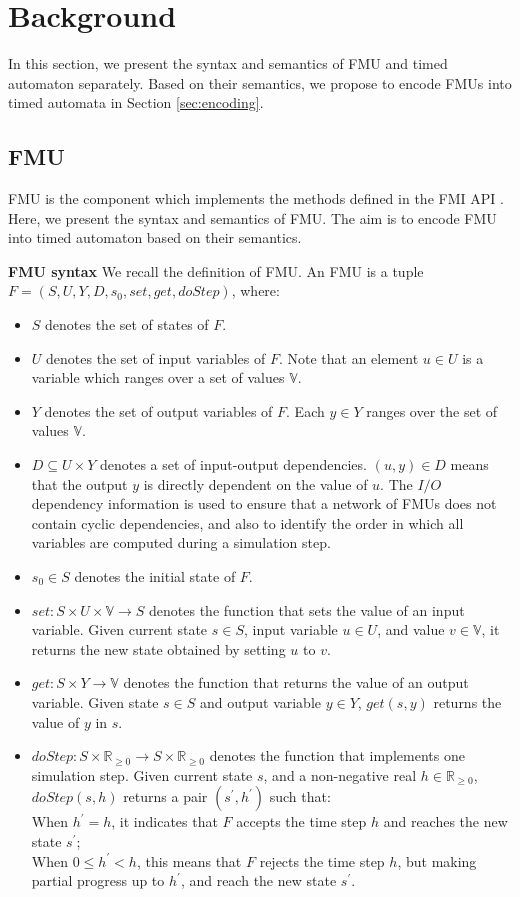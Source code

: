\section{Background}
\label{sec:fmi}
In this section, we present the syntax and semantics of FMU and timed automaton separately. Based on their semantics, we propose to encode FMUs into timed automata in Section \ref{sec:encoding}. 

\subsection{FMU}
FMU is the component which implements the methods defined in the FMI API \cite{Tripakis15}. Here, we present the syntax and semantics of FMU. The aim is to encode FMU into timed automaton based on their semantics.
\begin{definition}
\textbf{FMU syntax}
We recall the definition of FMU. An FMU is a tuple $F=(S,U,Y,D,s_{0},set,get,doStep)$, where:
\end{definition}
\begin{itemize}
\item
$S$ denotes the set of states of $F$. 
\item
$U$ denotes the set of input variables of $F$. Note that an element $u \in U$ is a variable which ranges over a set of values $\mathbb{V}$. 
\item
$Y$ denotes the set of output variables of $F$. Each $y \in Y$ ranges over the set of values $\mathbb{V}$.
\item
$D \subseteq U \times Y$ denotes a set of input-output dependencies. $(u,y) \in D $ means that the output $y$ is directly dependent on the value of $u$. The $I/O$ dependency information is used to ensure that a network of FMUs does not contain cyclic dependencies, and also to identify the order in which all variables are computed during a simulation step.
\item
$s_{0} \in S$ denotes the initial state of $F$.
\item
$set : S \times U \times \mathbb{V} \rightarrow S$ denotes the function that sets the value of an input variable. Given current state $s \in S$, input variable $u \in U$, and value $v \in \mathbb{V}$, it returns the new state obtained by setting $u$ to $v$.
\item
$get : S \times Y \rightarrow \mathbb{V}$ denotes the function that returns the value of an output variable. Given state $s \in S$ and output variable $y \in Y$, $get(s,y)$ returns the value of $y$ in $s$.
\item
$doStep : S \times \mathbb{R}_{\geqslant{0}} \rightarrow S \times \mathbb{R}_{\geqslant{0}}$ denotes the function that implements one simulation step. Given current state $s$, and a non-negative real $h \in \mathbb{R}_{\geqslant{0}}$, $doStep(s,h)$ returns a pair $(s^{\prime},h^{\prime})$ such that:
\\
When $h^{\prime} = h$, it indicates that $F$ accepts the time step $h$ and reaches the new state $s^{\prime}$;
\\
When $0 \leqslant h^{\prime} < h$, this means that $F$ rejects the time step $h$, but making partial progress up to $h^{\prime}$, and reach the new state $s^{\prime}$.
\end{itemize}
